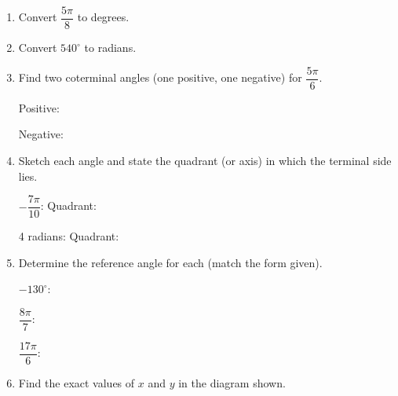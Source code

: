 



\begin{enumerate}[leftmargin=*, label=\textbf{\arabic*.}, resume]

  \item Convert $\dfrac{5\pi}{8}$ to degrees. 
  \vgap

  \item Convert $540^{\circ}$ to radians. 
  \vgap

  \item Find two coterminal angles (one positive, one negative) for $\dfrac{5\pi}{6}$. 

  Positive: \blank

  Negative: \blank
  \vgapp

  \item Sketch each angle and state the quadrant (or axis) in which the terminal side lies. 

  $-\dfrac{7\pi}{10}$: Quadrant: \blank

  4 radians: Quadrant: \blank
  \vgapp

  \item Determine the reference angle for each (match the form given). 

  $-130^{\circ}$: \blank

  $\dfrac{8\pi}{7}$: \blank

  $\dfrac{17\pi}{6}$: \blank
  \vgappp


  \newpage
  \item Find the exact values of $x$ and $y$ in the diagram shown. 

  \begin{center}
  \end{center}


\end{enumerate}
